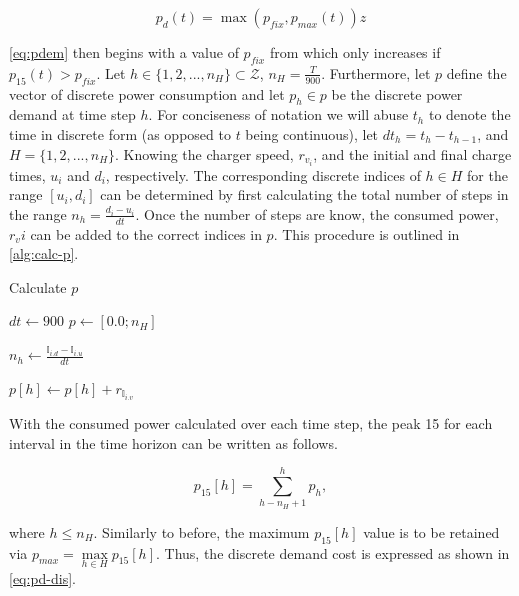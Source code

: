 \documentclass[11pt,a4paper,final]{article}
\newcommand{\I}{\mathbb{I}}                 %
\newcommand{\Hset}{H}                       %
\begin{document}
\begin{equation}
\label{eq:pdem}
p_d(t) = \max(p_{fix},p_{max}(t))z
\end{equation}

\ref{eq:pdem} then begins with a value of \(p_{fix}\) from which only increases if \(p_{15}(t) > p_{fix}\). Let \(h \in \{ 1, 2, ...,
n_H \} \subset \mathcal{Z}\), \(n_H = \frac{T}{900}\). Furthermore, let \(p\) define the vector of discrete power consumption and let \(p_h \in
p\) be the discrete power demand at time step \(h\). For conciseness of notation we will abuse \(t_h\) to denote the time in
discrete form (as opposed to \(t\) being continuous), let \(dt_h = t_h - t_{h-1}\), and \(\Hset = \{ 1, 2, ..., n_H \}\).
Knowing the charger speed, \(r_{v_i}\), and the initial and final charge times, \(u_i\) and \(d_i\), respectively. The
corresponding discrete indices of \(h \in \Hset\) for the range \([u_i, d_i]\) can be determined by first calculating the
total number of steps in the range \(n_h = \frac{d_i - u_i}{dt}\). Once the number of steps are know, the consumed power,
\(r_v{i}\) can be added to the correct indices in \(p\). This procedure is outlined in \ref{alg:calc-p}.

\begin{algorithm}[H]
\caption{Calculate $p$} \label{alg:calc-p}
\LinesNumbered
{}
\KwIn{$(\I, r)$}

\Begin
{
  $dt \leftarrow 900$
  $p \leftarrow [0.0; n_H]$

  \ForEach {$\I_i \in \I$}
  {
    $n_h \leftarrow \frac{\I_{i.d} - \I_{i.u}}{dt}$

    {
      $p[h] \leftarrow p[h] + r_{\I_{i.v}}$
    }
  }
}
\end{algorithm}

With the consumed power calculated over each time step, the peak 15 for each interval in the time horizon can be written
as follows.

\begin{equation}
p_{15}[h] = \sum_{h-n_H+1}^h p_h,
\end{equation}

where \(h \le n_H\). Similarly to before, the maximum \(p_{15}[h]\) value is to be retained via \(p_{max} = \max\limits_{h \in
H}p_{15}[h]\). Thus, the discrete demand cost is expressed as shown in \ref{eq:pd-dis}.
\end{document}
